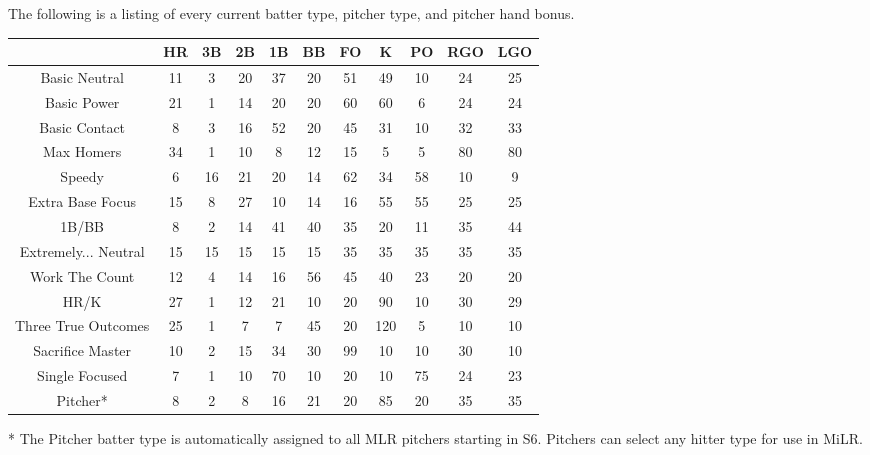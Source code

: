 
The following is a listing of every current batter type, pitcher type, and pitcher hand bonus. 
\begin{center}
	\begin{tabular}{|c|c|c|c|c|c|c|c|c|c|c|}
		\hline
		                     & HR & 3B & 2B & 1B & BB & FO & K   & PO & RGO & LGO    \\
		\hline 
		Basic Neutral        & 11 & 3  & 20 & 37 & 20 & 51 & 49  & 10 & 24  & 25     \\
		\hline
		Basic Power          & 21 & 1  & 14 & 20 & 20 & 60 & 60  & 6  & 24  & 24     \\
		\hline
		Basic Contact        & 8  & 3  & 16 & 52 & 20 & 45 & 31  & 10 & 32  & 33     \\
		\hline
		Max Homers           & 34 & 1  & 10  & 8  & 12  & 15 & 5   & 5  & 80  & 80     \\
		\hline
		Speedy               & 6  & 16 & 21 & 20 & 14 & 62 & 34  & 58 & 10  & 9      \\
		\hline
		Extra Base Focus     & 15 & 8  & 27 & 10 & 14  & 16 & 55  & 55 & 25  & 25     \\
		\hline
		1B/BB                & 8  & 2  & 14 & 41 & 40 & 35 & 20  & 11  & 35  & 44     \\
		\hline
		Extremely... Neutral & 15 & 15 & 15 & 15 & 15 & 35 & 35  & 35 & 35  & 35     \\
		\hline
		Work The Count       & 12 & 4  & 14 & 16 & 56 & 45 & 40  & 23 & 20  & 20     \\
		\hline
		HR/K                 & 27 & 1  & 12 & 21 & 10 & 20 & 90  & 10  & 30  & 29     \\
		\hline
		Three True Outcomes  & 25 & 1  & 7  & 7 & 45 & 20 & 120 & 5  & 10  & 10     \\
		\hline
		Sacrifice Master     & 10 & 2  & 15 & 34 & 30 & 99 & 10  & 10 & 30  & 10     \\
		\hline
		Single Focused       & 7 & 1  & 10 & 70 & 10 & 20 & 10  & 75 & 24  & 23     \\
		\hline
		Pitcher*       & 8 & 2  & 8 & 16 & 21 & 20 & 85  & 20 & 35  & 35     \\
		\hline
	\end{tabular}
\end{center}

* The Pitcher batter type is automatically assigned to all MLR pitchers starting in S6. Pitchers can select any hitter type for use in MiLR.

